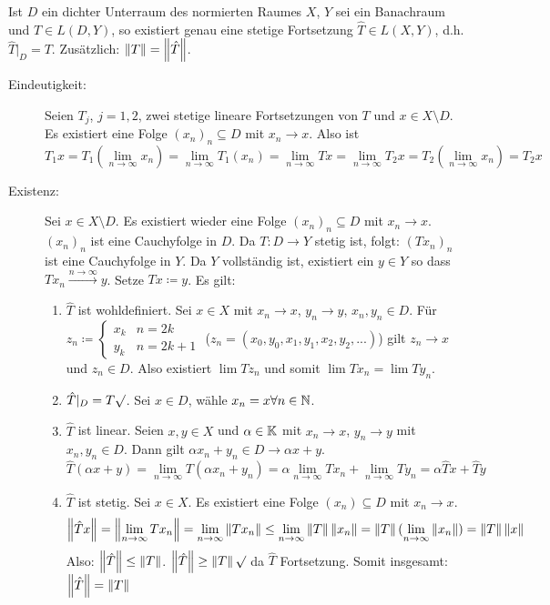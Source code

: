 \begin{satz}
	Ist $ D $ ein dichter Unterraum des normierten Raumes $ X $, $ Y $ sei ein Banachraum und $ T\in L(D,Y) $, so existiert genau eine stetige Fortsetzung $ \hat T\in L(X,Y) $, d.h. $ \hat T|_D=T $. Zus\"atzlich: $ \left\|T\right\|=\left\|\hat T\right\| $.
\end{satz}
\begin{beweis}
	\begin{description}
		\item[Eindeutigkeit:] Seien $ T_j $, $ j=1,2 $, zwei stetige lineare Fortsetzungen von $ T $ und $ x\in X\setminus D $. Es existiert eine Folge $ (x_n)_n\subseteq D $ mit $ x_n\rightarrow x $. Also ist \[ T_1 x=T_1(\lim_{n\to\infty}x_n)=\lim_{n\to\infty}T_1(x_n)=\lim_{n\to\infty}Tx=\lim_{n\to\infty}T_2 x=T_2(\lim_{n\to\infty}x_n)=T_2x \]
		\item[Existenz:] Sei $ x\in X\setminus D $. Es existiert wieder eine Folge $ (x_n)_n\subseteq D $ mit $ x_n\rightarrow x $. $ (x_n)_n $ ist eine Cauchyfolge in $ D $. Da $ T\colon D\rightarrow Y$ stetig ist, folgt: $ (Tx_n)_n $ ist eine Cauchyfolge in $ Y $. Da $ Y $ vollst\"andig ist, existiert ein $ y\in Y $ so dass $ Tx_n\xrightarrow{n\to\infty} y $. Setze $ Tx\coloneqq y $. Es gilt:
		\begin{enumerate}
			\item $\hat T $ ist wohldefiniert. Sei $ x\in X $ mit $ x_n\rightarrow x $, $ y_n\rightarrow y $, $ x_n,y_n\in D $. F\"ur $ z_n\coloneqq \begin{cases}
			x_k&n=2k\\y_k&n=2k+1
			\end{cases} $ ($ z_n=(x_0,y_0,x_1,y_1,x_2,y_2,...) $) gilt $ z_n\rightarrow x $ und $ z_n\in D $. Also existiert $ \lim T z_n $ und somit $ \lim Tx_n=\lim Ty_n $.
			\item $ \hat T|_D=T\surd $. Sei $ x\in D $, w\"ahle $ x_n=x\forall n\in\mathbb{N} $.
			\item $ \hat T $ ist linear. Seien $ x,y\in X $ und $ \alpha\in\mathbb{K} $ mit $ x_n\rightarrow x $, $ y_n\rightarrow y $ mit $ x_n,y_n\in D $. Dann gilt $ \alpha x_n+y_n\in D\rightarrow \alpha x+y $.
			\[ \hat T(\alpha x+y)=\lim_{n\to\infty}T(\alpha x_n+y_n)=\alpha\lim_{n\to\infty}T x_n+\lim_{n\to\infty}Ty_n=\alpha\hat Tx+\hat Ty \]
			\item $ \hat T $ ist stetig. Sei $ x\in X $. Es existiert eine Folge $ (x_n)\subseteq D $ mit $ x_n\rightarrow x $.
			\[ \left\|\hat Tx\right\|=\left\|\lim_{n\to\infty}Tx_n\right\|=\lim_{n\to\infty}\left\|Tx_n\right\|\leq\lim_{n\to\infty}\left\|T\right\|\left\|x_n\right\|=\left\|T\right\|(\lim_{n\to\infty}\left\|x_n\right\|)=\left\|T\right\|\left\|x\right\| \]
			Also: $ \left\|\hat T\right\|\leq\left\|T\right\| $. $ \left\|\hat T\right\|\geq\left\|T\right\|\surd $ da $ \hat T $ Fortsetzung. Somit insgesamt: $ \left\|\hat T\right\|=\left\|T\right\| $
 		\end{enumerate}
	\end{description}\vspace{-22pt}
\end{beweis}
